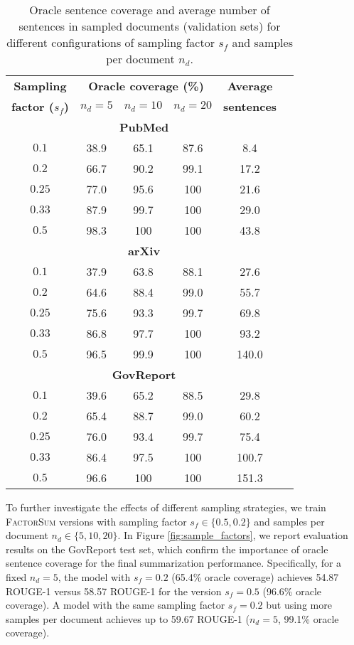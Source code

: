 \documentclass[11pt,table]{article}
\newcommand{\modelname}{FactorSum}
\begin{document}
\begin{table}[H]
  \centering
  \setlength{}
  \begin{tabular}{cccccc}
    \toprule
    \multicolumn{1}{c}{\textbf{Sampling}} & \multicolumn{3}{c}{\textbf{Oracle coverage (\%)}} & \textbf{Average} \\
\multicolumn{1}{c}{\textbf{factor ($s_f$)}} & $n_d=5$ & $n_d=10$ & $n_d=20$ & \textbf{sentences} \\
    \midrule
    \multicolumn{5}{c}{\textbf{PubMed}} \\
    \midrule
    $0.1$ & 38.9 & 65.1 & 87.6 & 8.4  \\
    $0.2$ & 66.7 & 90.2 & 99.1 & 17.2  \\
    $0.25$ & 77.0 & 95.6 & 100 & 21.6  \\
    $0.33$ & 87.9 & 99.7 & 100 & 29.0 \\
    $0.5$ & 98.3 & 100 & 100 & 43.8 \\
    \midrule
    \multicolumn{5}{c}{\textbf{arXiv}} \\
    \midrule
    $0.1$ & 37.9 & 63.8 & 88.1 & 27.6  \\
    $0.2$ & 64.6 & 88.4 & 99.0 & 55.7  \\
    $0.25$ & 75.6 & 93.3 & 99.7 & 69.8  \\
    $0.33$ & 86.8 & 97.7 & 100 & 93.2 \\
    $0.5$ & 96.5 & 99.9 & 100 & 140.0 \\
    \midrule
    \multicolumn{5}{c}{\textbf{GovReport}} \\
    \midrule
    $0.1$ & 39.6 & 65.2 & 88.5 & 29.8  \\
    $0.2$ & 65.4 & 88.7 & 99.0 & 60.2  \\
    $0.25$ & 76.0 & 93.4 & 99.7 & 75.4  \\
    $0.33$ & 86.4 & 97.5 & 100 & 100.7 \\
    $0.5$ & 96.6 & 100 & 100 & 151.3 \\
    \bottomrule
  \end{tabular}
  \caption{Oracle sentence coverage and average number of sentences in sampled documents (validation sets) for different configurations of sampling factor $s_f$ and samples per document $n_d$.}\label{tab:document_sampling}
\end{table}

To further investigate the effects of different sampling strategies, we train \textsc{\modelname} versions with  sampling factor $s_f \in \{0.5, 0.2\}$ and samples per document $n_d \in \{5, 10, 20\}$. In Figure \ref{fig:sample_factors}, we report evaluation results on the GovReport test set, which confirm the importance of oracle sentence coverage for the final summarization performance. Specifically, for a fixed $n_d=5$, the model with $s_f=0.2$ (65.4\% oracle coverage) achieves 54.87 ROUGE-1 versus 58.57 ROUGE-1 for the version $s_f=0.5$ (96.6\% oracle coverage). A model with the same sampling factor $s_f=0.2$ but using more samples per document achieves up to 59.67 ROUGE-1 ($n_d=5$, 99.1\% oracle coverage).
\end{document}
